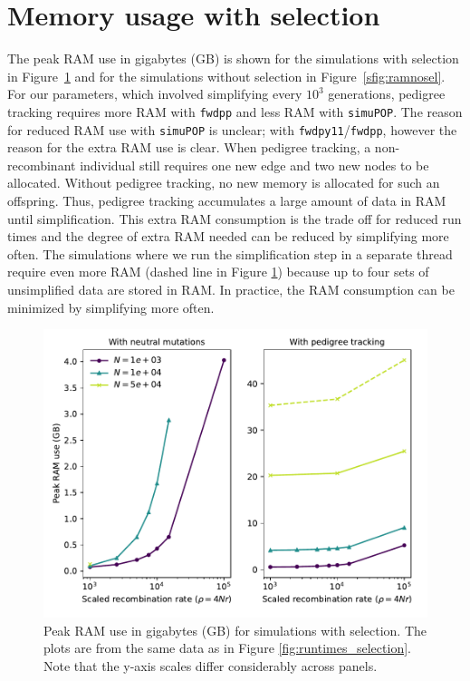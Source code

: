 \documentclass{article}
\newcommand{\simupop}{\texttt{simuPOP}}
\newcommand{\fwdpp}{\texttt{fwdpp}}
\newcommand{\fwdpy}{\texttt{fwdpy11}}
\newcommand{\krt}[1]{{\em \color{green} #1}}
\begin{document}

\section{Memory usage with selection}
\label{ss:memuse}
\renewcommand{\thefigure}{B\arabic{figure}}
\setcounter{figure}{0}

The peak RAM use in gigabytes (GB) is shown for the simulations with selection in Figure~\ref{sfig:ramsel} and for the
simulations without selection in Figure~\ref{sfig:ramnosel}.  For our parameters, which involved simplifying every
$10^3$ generations,  pedigree tracking requires more RAM with \fwdpp{} and less
RAM with \simupop{}. The reason for reduced RAM use with \simupop{} is unclear;
with \fwdpy{}/\fwdpp{}, however the reason for the extra RAM use is clear.  When pedigree tracking, a non-recombinant
individual still requires one new edge and two new nodes to be allocated.  Without pedigree tracking, no new memory is
allocated for such an offspring.  Thus, pedigree tracking accumulates a large amount of data in RAM until
simplification.  This extra RAM consumption is the trade off for reduced run times and the degree of extra RAM needed
can be reduced by simplifying more often.  The simulations where we run the simplification step in a separate thread
require even more RAM (dashed line in Figure \ref{sfig:ramsel}) because up to four sets of unsimplified data are
stored in RAM.  In practice, the RAM consumption can be minimized by simplifying more often.


\begin{figure}
    \includegraphics[]{sims/memuse}
    \caption{\label{sfig:ramsel}Peak RAM use in gigabytes (GB) for simulations with selection.  The plots are from the
        same data as in Figure \ref{fig:runtimes_selection}. Note that the y-axis scales differ considerably across
    panels.}
\end{figure}
\end{document}
